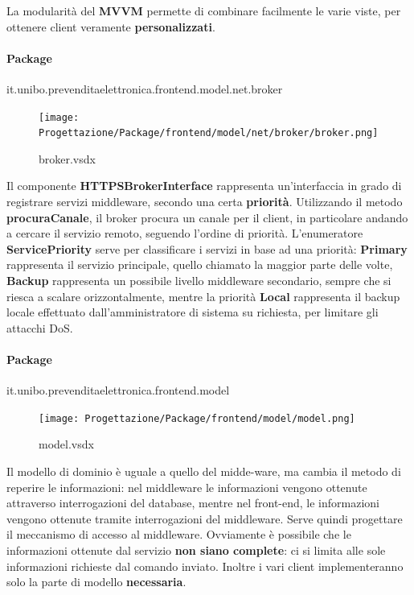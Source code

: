 \documentclass[a4paper]{article}
\begin{document}
La modularità del \textbf{MVVM} permette di combinare facilmente le varie viste, per ottenere client veramente \textbf{personalizzati}.

\paragraph{Package}it.unibo.prevenditaelettronica.frontend.model.net.broker


\begin{figure}[H]
    \texttt{[image: Progettazione/Package/frontend/model/net/broker/broker.png]}
    \centering
    \caption{broker.vsdx}
\end{figure}

Il componente \textbf{HTTPSBrokerInterface} rappresenta un'interfaccia in grado di registrare servizi middleware, secondo una certa \textbf{priorità}. Utilizzando il metodo \textbf{procuraCanale}, il broker procura un canale per il client, in particolare andando a cercare il servizio remoto, seguendo l'ordine di priorità. L'enumeratore \textbf{ServicePriority} serve per classificare i servizi in base ad una priorità: \textbf{Primary} rappresenta il servizio principale, quello chiamato la maggior parte delle volte, \textbf{Backup} rappresenta un possibile livello middleware secondario, sempre che si riesca a scalare orizzontalmente, mentre la priorità \textbf{Local} rappresenta il backup locale effettuato dall'amministratore di sistema su richiesta, per limitare gli attacchi DoS.

\newpage

\paragraph{Package} it.unibo.prevenditaelettronica.frontend.model

\begin{figure}[H]
    \texttt{[image: Progettazione/Package/frontend/model/model.png]}
    \centering
    \caption{model.vsdx}
\end{figure}

Il modello di dominio è uguale a quello del midde-ware, ma cambia il metodo di reperire le informazioni: nel middleware le informazioni vengono ottenute attraverso interrogazioni del database, mentre nel front-end, le informazioni vengono ottenute tramite interrogazioni del middleware. Serve quindi progettare il meccanismo di accesso al middleware. Ovviamente è possibile che le informazioni ottenute dal servizio \textbf{non siano complete}: ci si limita alle sole informazioni richieste dal comando inviato. Inoltre i vari client implementeranno solo la parte di modello \textbf{necessaria}.
\end{document}
